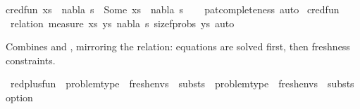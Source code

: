 \begin{isabellebody}
{\isachardoublequoteopen}cred{\isacharunderscore}{\kern0pt}fun\ {\isacharparenleft}{\kern0pt}{\isacharparenleft}{\kern0pt}xs{\isacharcomma}{\kern0pt}\ {\isacharbrackleft}{\kern0pt}{\isacharbrackright}{\kern0pt}{\isacharparenright}{\kern0pt}{\isacharcomma}{\kern0pt}\ nabla{\isacharcomma}{\kern0pt}\ s{\isacharparenright}{\kern0pt}\ {\isacharequal}{\kern0pt}\ Some\ {\isacharparenleft}{\kern0pt}{\isacharparenleft}{\kern0pt}xs{\isacharcomma}{\kern0pt}\ {\isacharbrackleft}{\kern0pt}{\isacharbrackright}{\kern0pt}{\isacharparenright}{\kern0pt}{\isacharcomma}{\kern0pt}\ nabla{\isacharcomma}{\kern0pt}\ s{\isacharparenright}{\kern0pt}{\isachardoublequoteclose}\isanewline
%
\isadelimproof
\ \ %
\endisadelimproof
%
\isatagproof
{}\isamarkupfalse%
\ pat{\isacharunderscore}{\kern0pt}completeness\ auto%
\endisatagproof
{\isafoldproof}%
%
\isadelimproof
\isanewline
%
\endisadelimproof
\isanewline
{}\isamarkupfalse%
\ cred{\isacharunderscore}{\kern0pt}fun\isanewline
%
\isadelimproof
\ \ %
\endisadelimproof
%
\isatagproof
{}\isamarkupfalse%
\ {\isacharparenleft}{\kern0pt}relation\ {\isachardoublequoteopen}measure\ {\isacharparenleft}{\kern0pt}{\isasymlambda}{\isacharparenleft}{\kern0pt}{\isacharparenleft}{\kern0pt}xs{\isacharcomma}{\kern0pt}\ ys{\isacharparenright}{\kern0pt}{\isacharcomma}{\kern0pt}\ nabla{\isacharcomma}{\kern0pt}\ s{\isacharparenright}{\kern0pt}{\isachardot}{\kern0pt}\ size{\isacharunderscore}{\kern0pt}fprobs\ ys{\isacharparenright}{\kern0pt}{\isachardoublequoteclose}{\isacharcomma}{\kern0pt}\ auto{\isacharparenright}{\kern0pt}%
\endisatagproof
{\isafoldproof}%
%
\isadelimproof
%
\endisadelimproof
%
\begin{isamarkuptext}%
Combines   and , mirroring the  relation: equations are solved first, then freshness constraints.%
\end{isamarkuptext}\isamarkuptrue%
\isamarkupfalse%
\ red{\isacharunderscore}{\kern0pt}plus{\isacharunderscore}{\kern0pt}fun\ {\isacharcolon}{\kern0pt}{\isacharcolon}{\kern0pt}\ {\isachardoublequoteopen}{\isacharparenleft}{\kern0pt}problem{\isacharunderscore}{\kern0pt}type\ {\isasymtimes}\ fresh{\isacharunderscore}{\kern0pt}envs\ {\isasymtimes}\ substs{\isacharparenright}{\kern0pt}\ {\isasymRightarrow}\ {\isacharparenleft}{\kern0pt}problem{\isacharunderscore}{\kern0pt}type\ {\isasymtimes}\ fresh{\isacharunderscore}{\kern0pt}envs\ {\isasymtimes}\ substs{\isacharparenright}{\kern0pt}\ option{\isachardoublequoteclose}\ \isanewline

\end{isabellebody}
